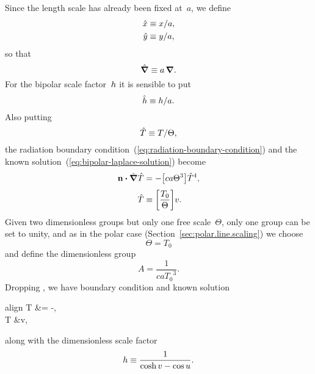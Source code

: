 Since the length scale has already been fixed at~$a$,
we define
\begin{align}
  \hat{x} &\equiv x / a, \label{eq:bipolar-scaled-x} \\
  \hat{y} &\equiv y / a, \label{eq:bipolar-scaled-y}
\end{align}
so that
\begin{equation}
  \mathop{}\!\hat{\mathop{}\!\boldsymbol{\mathbf{\nabla}}} \equiv a \mathop{}\!\boldsymbol{\mathbf{\nabla}}.
  \label{eq:bipolar-scaled-del}
\end{equation}
For the bipolar scale factor~$\scalefac$ it is sensible to put
\begin{equation}
  \scaled{\scalefac} \ideq \scalefac / a.
  \label{eq:bipolar-scaled-scale-factor}
\end{equation}
Also putting
\begin{equation}
  \hat{T} \equiv T / \Theta,
  \label{eq:bipolar-scaled-temperature}
\end{equation}
the radiation boundary condition~(\ref{eq:radiation-boundary-condition})
and the known solution~(\ref{eq:bipolar-laplace-solution})
become
\begin{align}
  \normalvec \dotp \scaleddel \scaled{T}
    &= -\group{c a \Theta^3} \scaled{T}^4,
    \label{eq:bipolar-scaled-radiation-boundary-condition-with-groups}
    \\[\tallspace]
  \scaled{T} &\ideq \group{\frac{T_0}{\Theta}} v.
    \label{eq:bipolar-scaled-laplace-solution-with-groups}
\end{align}
Given two dimensionless groups but only one free scale~$\Theta$,
only one group can be set to unity,
and as in the polar case (Section~\ref{sec:polar.line.scaling})
we choose
\begin{equation}
  \Theta = T_0
    \label{eq:bipolar-temperature-scale}
\end{equation}
and define the dimensionless group
\begin{equation}
  A = \frac{1}{c a {T_0}^3}.
  \label{eq:bipolar-dimensionless-group}
\end{equation}
Dropping \scalingmarks,
we have boundary condition and known solution
\begin{important}{align}
  \normalvec \dotp \del T &= -,
    \label{eq:bipolar-scaled-radiation-boundary-condition} \\
  T &\ideq v,
    \label{eq:bipolar-scaled-laplace-solution}
\end{important}
along with the dimensionless scale factor
\begin{equation}
  \scalefac \ideq \frac{1}{\cosh v - \cos u}.
  \label{eq:dimensionless-scale-factor-bipolar}
\end{equation}

